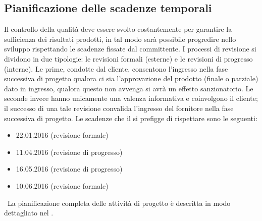 \documentclass[a4paper, titlepage]{article}
\begin{document}
\subsection{Pianificazione delle scadenze temporali}
Il controllo della qualità deve essere svolto costantemente per garantire la sufficienza dei risultati prodotti, in tal modo sarà possibile progredire nello sviluppo rispettando le scadenze fissate dal committente.
\newline I processi di revisione si dividono in due tipologie: le revisioni formali (esterne) e le revisioni di progresso (interne). Le prime, condotte dal cliente, consentono l'ingresso nella fase successiva di progetto qualora ci sia l'approvazione del prodotto (finale o parziale) dato in ingresso, qualora questo non avvenga si avrà un effetto sanzionatorio. Le seconde invece hanno unicamente una valenza informativa e coinvolgono il cliente; il successo di una tale revisione convalida l’ingresso del fornitore nella fase successiva di progetto.
\newline Le scadenze che il  si prefigge di rispettare sono le seguenti:
\begin{itemize}
\item {} 22.01.2016 (revisione formale)
\item {} 11.04.2016 (revisione di progresso)
\item {} 16.05.2016 (revisione di progresso)
\item {} 10.06.2016 (revisione formale)
\end{itemize}
\ 
\newline La pianificazione completa delle attività di progetto è descritta in modo dettagliato nel \PdPdoc.
\end{document}
